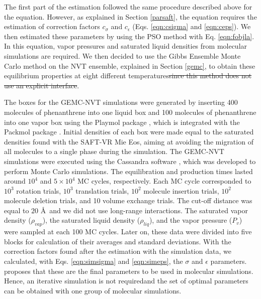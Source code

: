 \documentclass[
	12pt,				%
	openany,			%
	oneside,			%
	a4paper,			%
	english,			%
	brazil				%
	]{abntex2}
\providecommand{\DIFadd}[1]{{\protect\color{blue}\uwave{#1}}}
\providecommand{\DIFdel}[1]{{\protect\color{red}\sout{#1}}}
\providecommand{\DIFaddbegin}{}
\providecommand{\DIFaddend}{}
\providecommand{\DIFdelbegin}{}
\providecommand{\DIFdelend}{}
\providecommand{\DIFadd}[1]{{\protect\color{blue}\uwave{#1}}} %
\providecommand{\DIFdel}[1]{{\protect\color{red}\sout{#1}}}                      %
\providecommand{\DIFaddbegin}{} %
\providecommand{\DIFaddend}{} %
\providecommand{\DIFdelbegin}{} %
\providecommand{\DIFdelend}{} %
\begin{document}
The first part of the estimation followed the same procedure described above for the  equation. However, as explained in Section \ref{parsaft}, the  equation requires the estimation of correction factors $c_{\sigma}$ and $c_{\epsilon}$ (Eqs. \eqref{eqn:csigma} and \eqref{eqn:ceps}). We then estimated these parameters by using the PSO method with Eq. \eqref{eqn:fobjla}. In this equation, vapor pressures and saturated liquid densities from molecular simulations are required. We then decided to use the Gibbs Ensemble Monte Carlo method on the NVT ensemble, explained in Section \ref{gemc}, to obtain these equilibrium properties at eight different temperatures\DIFdelbegin \DIFdel{since this method does not use an explicit interface}\DIFdelend .

The boxes for the GEMC-NVT simulations were generated by inserting 400 molecules of phenanthrene into one liquid box and 100 molecules of phenanthrene into one vapor box using the Playmol package \cite{playmol}, which is integrated with the Packmol package \cite{packmol}. Initial densities of each box were made equal to the saturated densities found with the SAFT-VR Mie Eos, aiming at avoiding the migration of all molecules to a single phase during the simulation. The GEMC-NVT simulations were executed using the Cassandra software \cite{doi:10.1063/1.3644939},  which was developed to perform Monte Carlo simulations. The equilibration and production times lasted around  $10^{4}$ and $5 \times 10^{4}$ MC cycles, respectively. Each MC cycle corresponded to $10^3$ rotation trials, $10^3$ translation trials, $10^2$ molecule insertion trials, $10^2$ molecule deletion trials, and 10 volume exchange trials. The cut-off distance was equal to $20$ \AA  $\,$ and we did not use long-range interactions. The saturated vapor density ($\rho_{vap}$), the saturated liquid density ($\rho_{liq}$), and the vapor pressure ($P_{v}$) were sampled at each 100 MC cycles. Later on, these data were divided into five blocks for calculation of their averages and standard deviations. With the correction factors found after the estimation with the simulation data, we calculated, with Eqs. \eqref{eqn:simsigma} and \eqref{eqn:simeps}, the $\sigma$ and $\epsilon$ parameters.  proposes that these are the final parameters to be used in molecular simulations. Hence, an iterative simulation is not required\DIFaddbegin \DIFadd{, }\DIFaddend and the set of optimal parameters can be obtained with one group of molecular simulations. 
\end{document}
